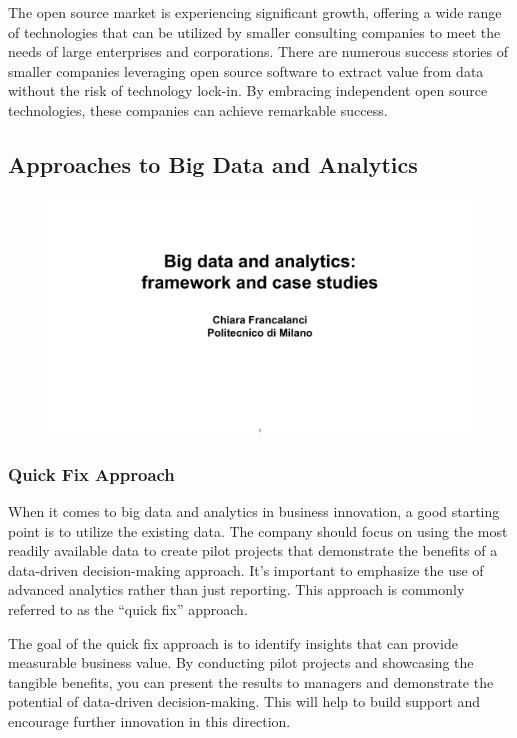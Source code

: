 The open source market is experiencing significant growth, offering a
wide range of technologies that can be utilized by smaller consulting
companies to meet the needs of large enterprises and corporations. There
are numerous success stories of smaller companies leveraging open source
software to extract value from data without the risk of technology
lock-in. By embracing independent open source technologies, these
companies can achieve remarkable success.

\subsection{Approaches to Big Data and Analytics}

\begin{figure}[!h]
    \centering
    \includegraphics[page=63, trim = 1cm 5cm 1cm 4.5cm, clip, width=\textwidth]{images/06 - BIG_DATA.pdf}
\end{figure}

\subsubsection{Quick Fix Approach}

When it comes to big data and analytics in business innovation, a good
starting point is to utilize the existing data. The company should focus
on using the most readily available data to create pilot projects that
demonstrate the benefits of a data-driven decision-making approach. It's
important to emphasize the use of advanced analytics rather than just
reporting. This approach is commonly referred to as the ``quick fix''
approach.

The goal of the quick fix approach is to identify insights that can
provide measurable business value. By conducting pilot projects and
showcasing the tangible benefits, you can present the results to
managers and demonstrate the potential of data-driven decision-making.
This will help to build support and encourage further innovation in this
direction.

